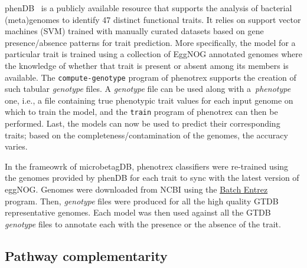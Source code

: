 \documentclass[sn-mathphys,Numbered]{sn-jnl}%
\theoremstyle{thmstyleone}%
\theoremstyle{thmstyletwo}%
\theoremstyle{thmstylethree}%
\begin{document}
        phenDB~\cite{feldbauer2015prediction} is a publicly available resource that supports the analysis of bacterial (meta)genomes to identify 47 distinct functional traits. 
        It relies on support vector machines (SVM) trained with manually curated datasets based on gene presence/absence patterns for trait prediction.
        More specifically, the model for a particular trait is trained using a collection of EggNOG annotated genomes where the knowledge of whether that trait is present or absent among its members is available.
        The \texttt{compute-genotype} program of phenotrex supports the creation of such tabular \textit{genotype} files.
        A \textit{genotype} file can be used along with a~\textit{phenotype} one, i.e., a file containing true phenotypic trait values for each input genome on which to train the model, and the \texttt{train} program of phenotrex can then be performed. 
        Last, the models can now be used to predict their corresponding traits; based on the completeness/contamination of the genomes, the accuracy varies. 
        
        In the frameowrk of microbetagDB, phenotrex classifiers were re-trained using the genomes provided by phenDB for each trait to sync with the latest version of eggNOG. 
        Genomes were downloaded from NCBI using the \href{https://www.ncbi.nlm.nih.gov/sites/batchentrez}{Batch Entrez} program.
        Then, \textit{genotype} files were produced for all the high quality GTDB representative genomes.
        Each model was then used against all the GTDB \textit{genotype} files to annotate each with the presence or the absence of the trait. 




    \subsection*{ Pathway complementarity }
        \label{subsec:path-compl}
\end{document}
